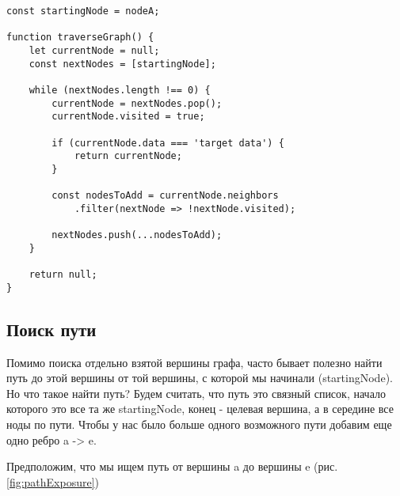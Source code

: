 \documentclass[../article.tex]{subfiles}
\begin{document}
\twocolumnbagebreak

\begin{strip}
    \begin{ruledelement}
        \begin{lstlisting}[caption={Обход графа в глубину}, label={lst:graphDfs}]
const startingNode = nodeA;

function traverseGraph() {
    let currentNode = null;
    const nextNodes = [startingNode];

    while (nextNodes.length !== 0) {
        currentNode = nextNodes.pop();
        currentNode.visited = true;

        if (currentNode.data === 'target data') {
            return currentNode;
        }

        const nodesToAdd = currentNode.neighbors
            .filter(nextNode => !nextNode.visited);

        nextNodes.push(...nodesToAdd);
    }

    return null;
}
        \end{lstlisting}
    \end{ruledelement}
\end{strip}

\subsection{Поиск пути}

Помимо поиска отдельно взятой вершины графа, часто бывает полезно найти путь до этой вершины от той вершины, с которой мы начинали ({\firacodebold startingNode}). Но что такое найти путь? Будем считать, что путь это связный список, начало которого это все та же {\firacodebold startingNode}, конец - целевая вершина, а в середине все ноды по пути. Чтобы у нас было больше одного возможного пути добавим еще одно ребро {\firacodebold a -> e}.

Предположим, что мы ищем путь от вершины {\firacodebold a} до вершины {\firacodebold e} (рис. \ref{fig:pathExposure})
\end{document}
